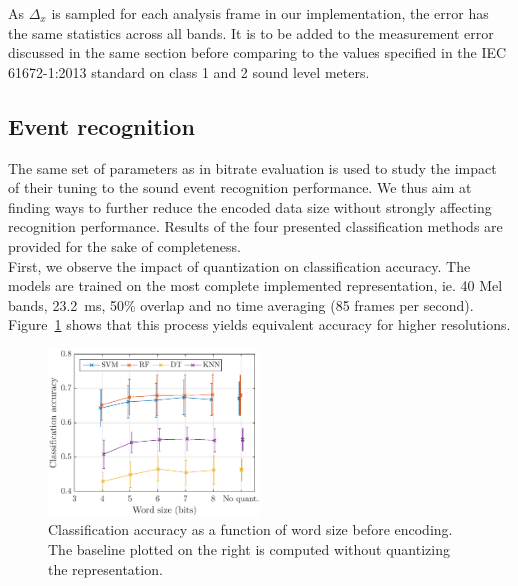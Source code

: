 \documentclass[sensors,article,submit,moreauthors,pdftex,10pt,a4paper]{mdpi}
\begin{document}
As $\Delta_x$ is sampled for each analysis frame in our implementation, the error has the same statistics across all bands. It is to be added to the measurement error discussed in the same section before comparing to the values specified in the IEC 61672-1:2013 \cite{iec-norm2} standard on class 1 and 2 sound level meters.

\subsection{Event recognition} \label{sec:eventRec}

The same set of parameters as in bitrate evaluation is used to study the impact of their tuning to the sound event recognition performance. We thus aim at finding ways to further reduce the encoded data size without strongly affecting recognition performance. Results of the four presented classification methods are provided for the sake of completeness.\\

First, we observe the impact of quantization on classification accuracy. The models are trained on the most complete implemented representation, ie. 40 Mel bands, 23.2~ms, 50\% overlap and no time averaging (85 frames per second). Figure~\ref{fig:class_mel_q} shows that this process yields equivalent accuracy for higher resolutions.\\

\begin{figure}[htbp]
	\centering
		\includegraphics[width=0.5\textwidth]{figures/class_mel_q.eps}
	\caption{Classification accuracy as a function of word size before encoding. The baseline plotted on the right is computed without quantizing the representation.}
	\label{fig:class_mel_q}
\end{figure}
\end{document}
